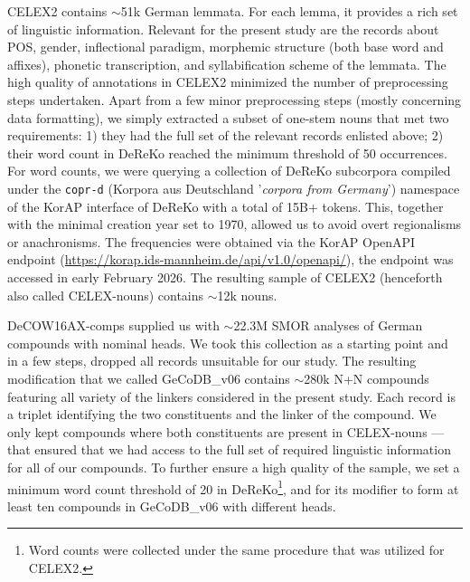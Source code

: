 \documentclass[10pt, a4paper]{article}
\begin{document}
CELEX2 contains $\sim$51k German lemmata. For each lemma, it provides a rich set of linguistic information. Relevant for the present study are the records about POS, gender, inflectional paradigm, morphemic structure (both base word and affixes), phonetic transcription, and syllabification scheme of the lemmata. The high quality of annotations in CELEX2 minimized the number of preprocessing steps undertaken. Apart from a few minor preprocessing steps (mostly concerning data formatting), we simply extracted a subset of one-stem nouns that met two requirements: 1) they had the full set of the relevant records enlisted above; 2) their word count in DeReKo reached the minimum threshold of 50 occurrences. For word counts, we were querying a collection of DeReKo subcorpora compiled under the \texttt{copr-d} (Korpora aus Deutschland '\textit{corpora from Germany}') namespace of the KorAP interface of DeReKo with a total of 15B+ tokens. This, together with the minimal creation year set to 1970, allowed us to avoid overt regionalisms or anachronisms. The frequencies were obtained via the KorAP OpenAPI endpoint (\url{https://korap.ids-mannheim.de/api/v1.0/openapi/}), the endpoint was accessed in early February 2026. The resulting sample of CELEX2 (henceforth also called CELEX-nouns) contains $\sim$12k nouns.


DeCOW16AX-comps supplied us with $\sim$22.3M SMOR \citep{schmid_2004} analyses of German compounds with nominal heads. We took this collection as a starting point and in a few steps, dropped all records unsuitable for our study. The resulting modification that we called GeCoDB\_v06 contains $\sim$280k N+N compounds featuring all variety of the linkers considered in the present study. Each record is a triplet identifying the two constituents and the linker of the compound. We only kept compounds where both constituents are present in CELEX-nouns --- that ensured that we had access to the full set of required linguistic information for all of our compounds. To further ensure a high quality of the sample, we set a minimum word count threshold of 20 in DeReKo\footnote{Word counts were collected under the same procedure that was utilized for CELEX2.}, and for its modifier to form at least ten compounds in GeCoDB\_v06 with different heads.

\end{document}
